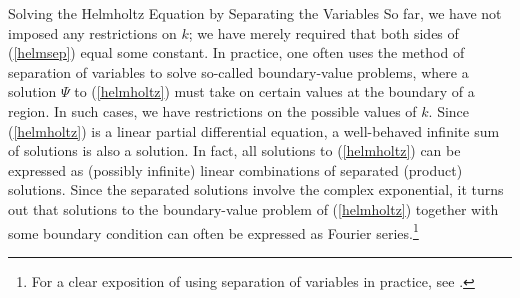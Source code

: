 \begin{section}{Solving the Helmholtz Equation by Separating the Variables}
So far, we have not imposed any restrictions on $k$; we have merely required that both sides of (\ref{helmsep}) equal some constant.  In practice, one often uses the method of separation of variables to solve so-called boundary-value problems, where a solution $\Psi$ to (\ref{helmholtz}) must take on certain values at the boundary of a region.  In such cases, we have restrictions on the possible values of $k$.  Since (\ref{helmholtz}) is a linear partial differential equation, a well-behaved infinite sum of solutions is also a solution.  In fact, all solutions to (\ref{helmholtz}) can be expressed as (possibly infinite) linear combinations of separated (product) solutions.  Since the separated solutions involve the complex exponential, it turns out that solutions to the boundary-value problem of (\ref{helmholtz}) together with some boundary condition can often be expressed as Fourier series.\footnote{For a clear exposition of using separation of variables in practice, see \cite{hildebrand}.}
\end{section}

